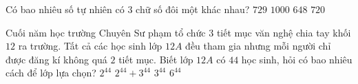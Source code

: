 \begin{ex}%
	Có bao nhiêu số tự nhiên có $3$ chữ số đôi một khác nhau?
	\choice
	{$729$}
	{$1000$}
	{\True $648$}
	{$720$}
\end{ex}%
\begin{ex}%
	Cuối năm học trường Chuyên Sư phạm tổ chức $3$ tiết mục văn nghệ chia tay khối $12$ ra trường. Tất cả các học sinh lớp $12A$ đều tham gia nhưng mỗi người chỉ được đăng kí không quá $2$ tiết mục. Biết lớp $12A$ có $44$ học sinh, hỏi có bao nhiêu cách để lớp lựa chọn?
	\choice
	{$2^{44}$}
	{$2^{44}+3^{44}$}
	{$3^{44}$}
	{\True $6^{44}$}
\end{ex}